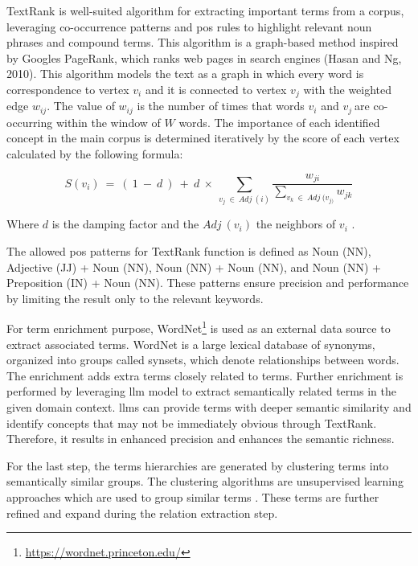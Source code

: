 TextRank is well-suited algorithm for extracting important terms from a
corpus, leveraging co-occurrence patterns and \gls{pos} rules to highlight
relevant noun phrases and compound terms. This algorithm is a
graph-based method inspired by Google\textquotesingle s PageRank, which
ranks web pages in search engines (Hasan and Ng, 2010). This algorithm
models the text as a graph in which every word is correspondence to
vertex \(v_{i}\) and it is connected to vertex \(v_{j}\) with the
weighted edge \(w_{ij}\). The value of \(w_{ij}\) is the number of times
that words \(v_{i}\) and \(v_{j}\ \)are co-occurring within the window
of \(W\) words. The importance of each identified concept in the main
corpus is determined iteratively by the score of each vertex calculated
by the following formula:

\begin{equation}
S(v_{i})\  = \ (\ 1\  - \ d\ )\  + \ d\  \times \ \sum_{v_{j}\  \in \ Adj\ (i)}^{}\frac{w_{ji}}{\sum_{v_{k}\  \in \ Adj\ (v_{j)}}^{}w_{jk}}
\end{equation}

Where \(d\) is the damping factor and the \(Adj\ (v_{i})\) the neighbors
of \(v_{i}\) \autocite{Chuang2012}.

The allowed \gls{pos} patterns for TextRank function is defined as Noun (NN),
Adjective (JJ) + Noun (NN), Noun (NN) + Noun (NN), and Noun (NN) +
Preposition (IN) + Noun (NN). These patterns ensure precision and
performance by limiting the result only to the relevant keywords.

For term enrichment purpose, WordNet\footnote{
  \url{https://wordnet.princeton.edu/}} is used as an external data source to extract associated
terms. WordNet is a large lexical database of synonyms, organized into
groups called synsets, which denote relationships between words. The
enrichment adds extra terms closely related to terms. Further enrichment
is performed by leveraging \gls{llm} model to extract semantically related
terms in the given domain context. \gls{llm}s can provide terms with deeper
semantic similarity and identify concepts that may not be immediately
obvious through TextRank. Therefore, it results in enhanced precision
and enhances the semantic richness.

For the last step, the terms hierarchies are generated by clustering
terms into semantically similar groups. The clustering algorithms are
unsupervised learning approaches which are used to group similar terms
\autocite{Asim2018}. These terms are further refined and expand
during the relation extraction step.

